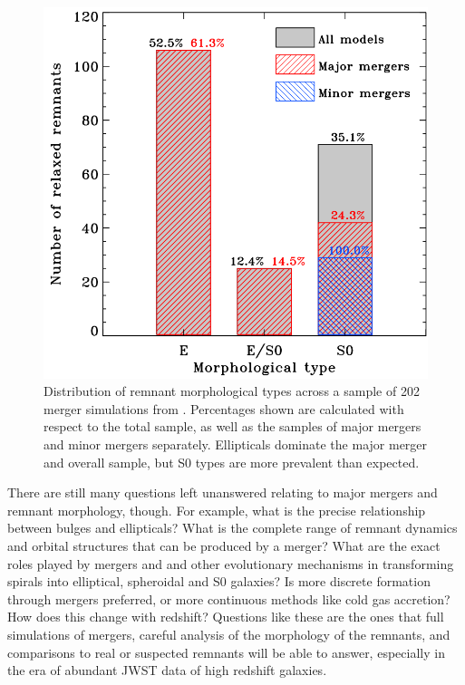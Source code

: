 \documentclass[twocolumn]{aastex631}
\begin{document}
\begin{figure}
    \centering
    \includegraphics[width=\linewidth]{morphs.png}
    \caption{
        Distribution of remnant morphological types across a sample of 202 merger simulations from \cite{Eliche-Moral+2018}.
        Percentages shown are calculated with respect to the total sample, as well as the samples of major mergers and minor mergers separately.
        Ellipticals dominate the major merger and overall sample, but S0 types are more prevalent than expected.
        }
    \label{fig:morphs}
\end{figure}
    
There are still many questions left unanswered relating to major mergers and remnant morphology, though. 
For example, what is the precise relationship between bulges and ellipticals? 
What is the complete range of remnant dynamics and orbital structures that can be produced by a merger? \citep{Barnes+1992}
What are the exact roles played by mergers and and other evolutionary mechanisms in transforming spirals into elliptical, spheroidal and S0 galaxies? \citep{Eliche-Moral+2018}
Is more discrete formation through mergers preferred, or more continuous methods like cold gas accretion? \citep{Lotz+2008}
How does this change with redshift?
Questions like these are the ones that full simulations of mergers, careful analysis of the morphology of the remnants, and comparisons to real or suspected remnants will be able to answer, especially in the era of abundant JWST data of high redshift galaxies.
\end{document}

